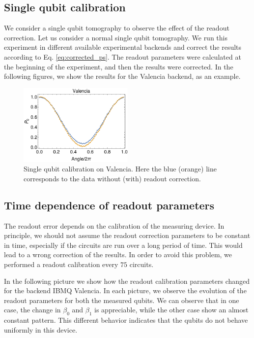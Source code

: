 \subsection{Single qubit calibration}

We consider a single qubit tomography to observe the effect of the readout correction. 
Let us consider a normal single qubit tomography. 
We run this experiment in different available experimental backends and correct the results according to Eq. \ref{eq:corrected_ps}. 
The readout parameters were calculated at the beginning of the experiment, and then the results were corrected. 
In the following figures, we show the results for the Valencia backend, as an example.


\begin{figure}[H]
    \centering
      \includegraphics[width=0.5\textwidth]{Figures/Calibrations/calibration_valencia.png}
    \caption{Single qubit calibration on Valencia. Here the blue (orange) line corresponds to the data without (with) readout correction.}
    \label{fig:readout_correction_tomography_valencia}
\end{figure}

\subsection{Time dependence of readout parameters}

The readout error depends on the calibration of the measuring device. 
In principle, we should not assume the readout correction parameters to be constant in time, especially if the circuits are run over a long period of time.
This would lead to a wrong correction of the results.
In order to avoid this problem, we performed a readout calibration every $75$ circuits.

In the following picture we show how the readout calibration parameters changed for the backend IBMQ Valencia. In each picture, we observe the evolution of the readout parameters for both the measured qubits. 
We can observe that in one case, the change in $\beta_0$ and $\beta_1$ is appreciable, while the other case show an almost constant pattern. This different behavior indicates that the qubits do not behave uniformly in this device.


